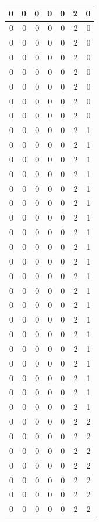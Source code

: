 \documentclass[
  12pt,
]{krantz}
\begin{document}
\begin{tabular}{r|r|r|r|r|r|r}
\hline
0 & 0 & 0 & 0 & 0 & 2 & 0\\
\hline
0 & 0 & 0 & 0 & 0 & 2 & 0\\
\hline
0 & 0 & 0 & 0 & 0 & 2 & 0\\
\hline
0 & 0 & 0 & 0 & 0 & 2 & 0\\
\hline
0 & 0 & 0 & 0 & 0 & 2 & 0\\
\hline
0 & 0 & 0 & 0 & 0 & 2 & 0\\
\hline
0 & 0 & 0 & 0 & 0 & 2 & 0\\
\hline
0 & 0 & 0 & 0 & 0 & 2 & 0\\
\hline
0 & 0 & 0 & 0 & 0 & 2 & 1\\
\hline
0 & 0 & 0 & 0 & 0 & 2 & 1\\
\hline
0 & 0 & 0 & 0 & 0 & 2 & 1\\
\hline
0 & 0 & 0 & 0 & 0 & 2 & 1\\
\hline
0 & 0 & 0 & 0 & 0 & 2 & 1\\
\hline
0 & 0 & 0 & 0 & 0 & 2 & 1\\
\hline
0 & 0 & 0 & 0 & 0 & 2 & 1\\
\hline
0 & 0 & 0 & 0 & 0 & 2 & 1\\
\hline
0 & 0 & 0 & 0 & 0 & 2 & 1\\
\hline
0 & 0 & 0 & 0 & 0 & 2 & 1\\
\hline
0 & 0 & 0 & 0 & 0 & 2 & 1\\
\hline
0 & 0 & 0 & 0 & 0 & 2 & 1\\
\hline
0 & 0 & 0 & 0 & 0 & 2 & 1\\
\hline
0 & 0 & 0 & 0 & 0 & 2 & 1\\
\hline
0 & 0 & 0 & 0 & 0 & 2 & 1\\
\hline
0 & 0 & 0 & 0 & 0 & 2 & 1\\
\hline
0 & 0 & 0 & 0 & 0 & 2 & 1\\
\hline
0 & 0 & 0 & 0 & 0 & 2 & 1\\
\hline
0 & 0 & 0 & 0 & 0 & 2 & 1\\
\hline
0 & 0 & 0 & 0 & 0 & 2 & 1\\
\hline
0 & 0 & 0 & 0 & 0 & 2 & 2\\
\hline
0 & 0 & 0 & 0 & 0 & 2 & 2\\
\hline
0 & 0 & 0 & 0 & 0 & 2 & 2\\
\hline
0 & 0 & 0 & 0 & 0 & 2 & 2\\
\hline
0 & 0 & 0 & 0 & 0 & 2 & 2\\
\hline
0 & 0 & 0 & 0 & 0 & 2 & 2\\
\hline
0 & 0 & 0 & 0 & 0 & 2 & 2\\

\end{tabular}
\end{document}
